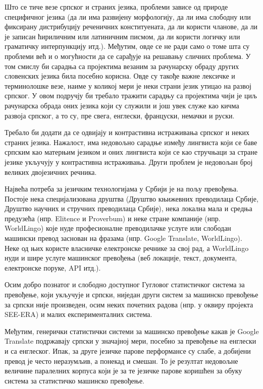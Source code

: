 \begin{multicols}{2}

Што се тиче везе српског и страних језика, проблеми зависе од природе специфичног језика (да ли има развијену морфологију, да ли има слободну или фиксирану дистрибуцију реченичних конституената, да ли користи чланове, да ли је записан ћириличним или латиничним писмом, да ли користи логичку или граматичку интерпункцију итд.). Међутим, овде се не ради само о томе шта су проблеми већ и о могућности да се сарађује на решавању сличних проблема. У том смислу би сарадња са пројектима везаним за рачунарску обраду других словенских језика била посебно корисна. Овде су такође важне лексичке и терминолошке везе, наиме у коликој мери је неки страни језик утицао на развој српског. У овом подручју би требало тражити сарадњу са пројектима чији је циљ рачунарска обрада оних језика који су служили и још увек служе као кичма развоја српског, а то су, пре свега, енглески, француски, немачки и руски.

Требало би додати да се одвијају и контрастивна истраживања српског и неких страних језика. Нажалост, има недовољно сарадње између лингвиста који се баве српским као матерњим језиком и оних лингвиста који се као стручњаци за стране језике укључују у контрастивна истраживања. Други проблем је недовољан број великих двојезичних речника. 

Највећа потреба за језичким технологијама у Србији је на пољу превођења. Постоје нека специјализована друштва (Друштво књижевних преводилаца Србије, Друштво научних и стручних преводилаца Србије), нека локална мала и средња предузећа (нпр. Elitence и Proverbum) и неке стране компаније (нпр. World\-Lingo) које нуде професионалне преводилачке услуге или слободан машински превод заснован на фразама (нпр. Google Translate, World\-Lingo). Неке од њих користе власничке електронске речнике за свој рад, а World\-Lingo нуди и шире услуге машинског превођења (веб локације, текст, документа, електронске поруке, API итд.).

Осим добро познатог и слободно доступног Гугловог статистичког система за превођење, који укључује и српски, ниједан други систем за машинско превођење за српски није произведен, осим неких почетних радова (нпр. у оквиру пројекта SEE-ERA) и малих експерименталних система.

Међутим, генерички статистички системи за машинско превођење какав је Google Translate подржавају српски у значајној мери, посебно за превођење на енглески и са енглеског. Ипак, за друге језичке парове перформансе су слабе, а добијени превод је често неразумљив, а понекад и смешан. То је резултат недовољне величине паралелних корпуса који је за те језичке парове коришћен за обуку система за статистичко машинско превођење. 


\end{multicols}
